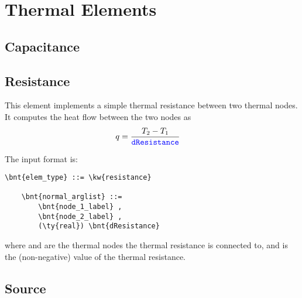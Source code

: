 %
%
%
%
%
%
%
%

\section{Thermal Elements}
\label{sec:EL:THERMO}

\subsection{Capacitance}
\label{sec:EL:THERMO:CAPACITANCE}

\subsection{Resistance}
\label{sec:EL:THERMO:RESISTANCE}

This element implements a simple thermal resistance between two thermal nodes.
It computes the heat flow between the two nodes as
\begin{align*}
	q &= \frac{T_2 - T_1}{\textcolor{blue}{\texttt{dResistance}}}
\end{align*}

The input format is:
\begin{Verbatim}[commandchars=\\\{\}]
    \bnt{elem_type} ::= \kw{resistance}

    \bnt{normal_arglist} ::= 
        \bnt{node_1_label} , 
        \bnt{node_2_label} , 
        (\ty{real}) \bnt{dResistance}
\end{Verbatim}
where  and  are the thermal nodes the thermal resistance is connected to, and  is the (non-negative) value of the thermal resistance.


\subsection{Source}
\label{sec:EL:THERMO:SOURCE}


